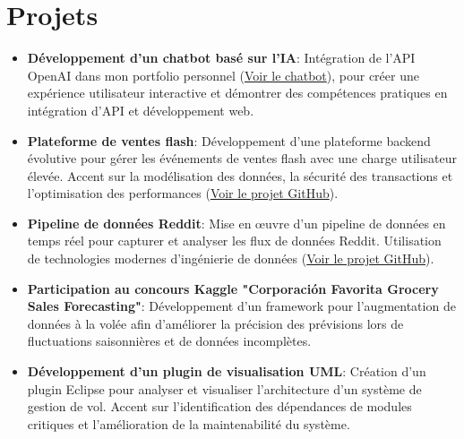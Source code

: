 \documentclass[10pt, letterpaper]{article}
\begin{document}
    
    
\section{Projets}

\begin{itemize}[leftmargin=*]
\item \textbf{Développement d'un chatbot basé sur l'IA}:  
Intégration de l'API OpenAI dans mon portfolio personnel (\href{https://personal-portfolio-mohamedayadidat.replit.app/chat}{Voir le chatbot}), pour créer une expérience utilisateur interactive et démontrer des compétences pratiques en intégration d'API et développement web.

\item \textbf{Plateforme de ventes flash}:  
Développement d'une plateforme backend évolutive pour gérer les événements de ventes flash avec une charge utilisateur élevée. Accent sur la modélisation des données, la sécurité des transactions et l'optimisation des performances (\href{https://github.com/Mayedi007/flash-sale-platform}{Voir le projet GitHub}).

\item \textbf{Pipeline de données Reddit}:  
Mise en œuvre d'un pipeline de données en temps réel pour capturer et analyser les flux de données Reddit. Utilisation de technologies modernes d'ingénierie de données (\href{https://github.com/Mayedi007/reddit-data-streaming-pipeline}{Voir le projet GitHub}).

\item \textbf{Participation au concours Kaggle "Corporación Favorita Grocery Sales Forecasting"}:  
Développement d'un framework pour l'augmentation de données à la volée afin d'améliorer la précision des prévisions lors de fluctuations saisonnières et de données incomplètes.

\item \textbf{Développement d'un plugin de visualisation UML}:  
Création d'un plugin Eclipse pour analyser et visualiser l'architecture d'un système de gestion de vol. Accent sur l'identification des dépendances de modules critiques et l'amélioration de la maintenabilité du système.
\end{itemize}









        \vspace{0.2 cm}
\end{document}
